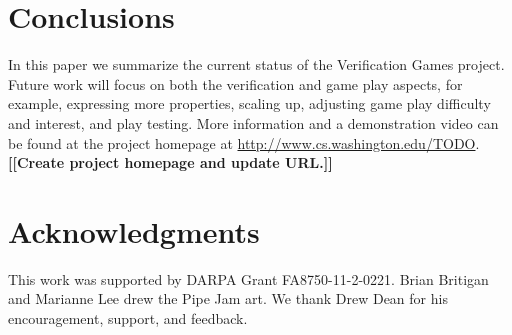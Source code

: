 \documentclass{sig-alternate}
\newcommand{\todo}[1]{{\color{red}\bfseries [[#1]]}}
\begin{document}
% 



\section{Conclusions}
\label{sec:conclusions}

In this paper we summarize the current status of the Verification
Games project.
Future work will focus on both the verification and game play aspects,
for example, expressing more properties, scaling up, adjusting game
play difficulty and interest, and play testing.
More information and a demonstration video can be found at the project
homepage at
\url{http://www.cs.washington.edu/TODO}.
\todo{Create project homepage and update URL.}


\section*{Acknowledgments}
 
This work was supported by DARPA Grant FA8750-11-2-0221.  Brian Britigan
and Marianne Lee drew the Pipe Jam art.  We thank Drew Dean for his
encouragement, support, and feedback.







\balancecolumns
\end{document}
